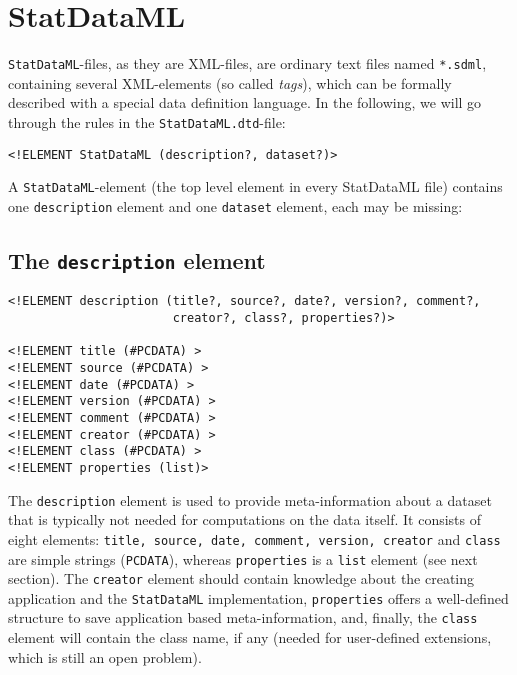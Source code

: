 \documentclass[a4paper]{article}
\begin{document}
\section{StatDataML}

\texttt{StatDataML}-files, as they are XML-files, are ordinary text files named
\texttt{*.sdml}, containing several XML-elements (so called
\emph{tags}), which can be formally described with a special data
definition language. In the following, we will go through the rules in the
\texttt{StatDataML.dtd}-file:

\begin{verbatim}
<!ELEMENT StatDataML (description?, dataset?)>
\end{verbatim}

A \texttt{StatDataML}-element (the top level element in every
StatDataML file) contains one \texttt{description} element and one
\texttt{dataset} element, each may be missing:

\subsection{The \texttt{description} element}

\begin{verbatim}
<!ELEMENT description (title?, source?, date?, version?, comment?,
                       creator?, class?, properties?)>

<!ELEMENT title (#PCDATA) >
<!ELEMENT source (#PCDATA) >
<!ELEMENT date (#PCDATA) >
<!ELEMENT version (#PCDATA) >
<!ELEMENT comment (#PCDATA) >
<!ELEMENT creator (#PCDATA) >
<!ELEMENT class (#PCDATA) >
<!ELEMENT properties (list)>

\end{verbatim}

The \texttt{description} element is used to provide meta-information
about a dataset that is typically not needed for computations on the
data itself. It consists of eight elements:
\texttt{title, source, date, comment, version, creator} and
\texttt{class} are simple 
strings (\texttt{PCDATA}), whereas \texttt{properties} is a \texttt{list} 
element (see next section). The \texttt{creator} element should
contain knowledge about the creating application and the \texttt{StatDataML}
implementation, \texttt{properties} offers a well-defined structure to save 
application based meta-information, and, finally, the \texttt{class}
element will contain the class name, if any
(needed for user-defined extensions, which is still an open problem).  
\end{document}
